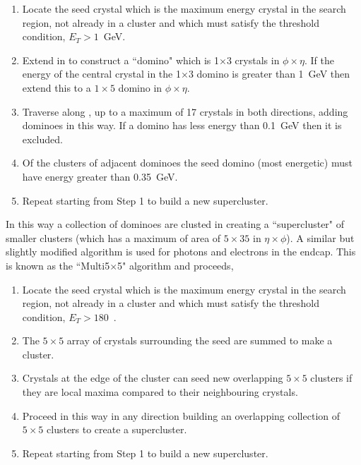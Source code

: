 \begin{enumerate}
  \item{Locate the seed crystal which is the maximum energy crystal in the search region, not already in a cluster and which must satisfy the threshold condition, $E_{T}>1$~GeV.}
  \item{Extend in \eta to construct a ``domino" which is 1$\times$3 crystals in $\phi\times\eta$. If the energy of the central crystal in the 1$\times$3 domino is greater than 1~GeV then extend this to a $1\times5$ domino in $\phi\times\eta$.}
  \item{Traverse along \phi, up to a maximum of 17 crystals in both directions, adding dominoes in this way. If a domino has less energy than 0.1~GeV then it is excluded.}
  \item{Of the clusters of adjacent dominoes the seed domino (most energetic) must have energy greater than 0.35~GeV.}
  \item{Repeat starting from Step 1 to build a new supercluster.}
\end{enumerate}

In this way a collection of dominoes are clusted in \phi creating a ``supercluster" of smaller clusters (which has a maximum of area of $5\times35$ in $\eta\times\phi$). A similar but slightly modified algorithm is used for photons and electrons in the endcap. This is known as the ``Multi5$\times$5" algorithm and proceeds,

\begin{enumerate}
  \item{Locate the seed crystal which is the maximum energy crystal in the search region, not already in a cluster and which must satisfy the threshold condition, $E_{T}>180$~\MeV.}
  \item{The $5\times5$ array of crystals surrounding the seed are summed to make a cluster.}
  \item{Crystals at the edge of the cluster can seed new overlapping $5\times5$ clusters if they are local maxima compared to their neighbouring crystals.}
  \item{Proceed in this way in any direction building an overlapping collection of $5\times5$ clusters to create a supercluster.}
  \item{Repeat starting from Step 1 to build a new supercluster.}
\end{enumerate}


